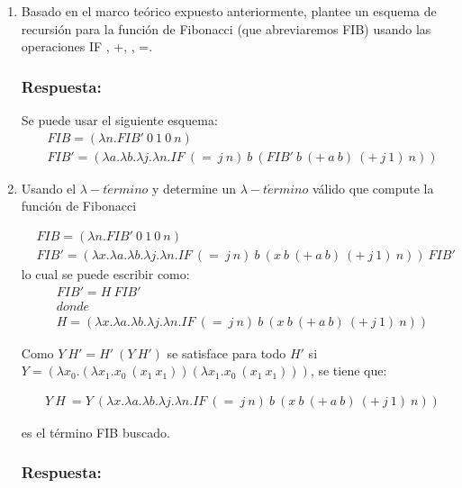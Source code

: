 \documentclass{article}
\begin{document}
\begin{enumerate}

\item Basado en el marco teórico expuesto anteriormente, plantee un esquema de recursión para la función de Fibonacci (que abreviaremos FIB) usando las operaciones IF , +, \textasteriskcentered, =.

\subsubsection*{Respuesta:}
Se puede usar el siguiente esquema:
\begin{align*}
&FIB=(\lambda n . FIB'\ 0\ 1\ 0\ n)
\\&FIB'=(\lambda a . \lambda b . \lambda j . \lambda n . IF\ (=\ j\ n)\ b\ (FIB'\ b\ (+\ a\ b)\ (+\ j\ 1)\ n))
\end{align*}




\item Usando el $\lambda-t \acute ermino$ y determine un $\lambda-t \acute ermino$ válido que compute la función de Fibonacci

\begin{align*}
&FIB=(\lambda n . FIB'\ 0\ 1\ 0\ n)
\\&FIB'=(\lambda x . \lambda a . \lambda b . \lambda j . \lambda n . IF\ (=\ j\ n)\ b\ (x\ b\ (+\ a\ b)\ (+\ j\ 1)\ n))\ FIB'
\end{align*}
lo cual se puede escribir como:
\begin{align*}
&FIB'=H\ FIB'
\\&donde
\\& H=(\lambda x . \lambda a . \lambda b . \lambda j . \lambda n . IF\ (=\ j\ n)\ b\ (x\ b\ (+\ a\ b)\ (+\ j\ 1)\ n))
\end{align*}

Como $Y\ H' = H'\ (Y\ H')$ se satisface para todo $H'$ si $Y=(\lambda x_0 . (\lambda x_1 . x_0\ (x_1\ x_1))(\lambda x_1 . x_0\ (x_1\ x_1)))$, se tiene que:

\begin{align*}
&Y\ H\ = Y\ (\lambda x . \lambda a . \lambda b . \lambda j . \lambda n . IF\ (=\ j\ n)\ b\ (x\ b\ (+\ a\ b)\ (+\ j\ 1)\ n))
\end{align*}

es el término FIB buscado.

\subsubsection*{Respuesta:}



\end{enumerate}
\end{document}
